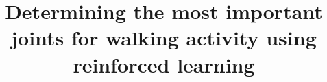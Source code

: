 \documentclass[review]{elsarticle}
\begin{document}
\begin{frontmatter}
\title{Determining the most important joints for walking activity using reinforced learning}

\end{frontmatter}





	
\end{document}

